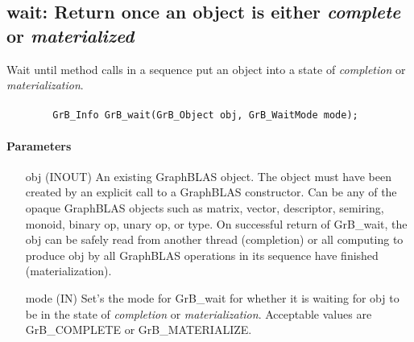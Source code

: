 \subsection{{\sf wait}: Return once an object is either \emph{complete} or \emph{materialized}}
\label{Sec:GrB_wait}

Wait until method calls in a sequence put an object 
into a state of \emph{completion} or \emph{materialization}.

\paragraph{\syntax}

\begin{verbatim}
        GrB_Info GrB_wait(GrB_Object obj, GrB_WaitMode mode);
\end{verbatim}

\paragraph{Parameters}

\begin{itemize}[leftmargin=1.1in]
        \item[{\sf obj}] ({\sf INOUT}) An existing GraphBLAS object.
        The object must have been created by an explicit call to a
        GraphBLAS constructor.  Can be any of the opaque GraphBLAS
        objects such as matrix, vector, descriptor, semiring, monoid,
        binary op, unary op, or type. On successful return of {\sf
        GrB\_wait}, the {\sf obj} can be safely read from another thread (completion)
        or all computing to produce {\sf obj} by all GraphBLAS operations 
        in its sequence have finished (materialization).   
        
        \item[{\sf mode}] ({\sf IN}) Set's the mode for {\sf GrB\_wait} for whether it is waiting 
        for {\sf obj} to be in the state of \emph{completion} or \emph{materialization}.  Acceptable 
        values are {\sf GrB\_COMPLETE} or {\sf GrB\_MATERIALIZE}. 
\end{itemize}

